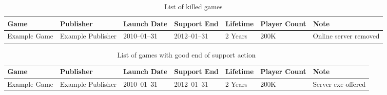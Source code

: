 \begin{landscape}
\begin{table}[htbp]
    \centering
    \caption{List of killed games}%
    \label{tab:killedgames}
    \begin{tabular*}{1\textwidth}{lllllll}
        Game & Publisher & Launch Date & Support End & Lifetime & Player Count & Note \\ \toprule
        Example Game & Example Publisher & 2010--01--31 & 2012--01--31 & 2 Years & 200K & Online server removed \\
    \end{tabular*}
\end{table}
\end{landscape}

\begin{landscape}
    \begin{table}[htbp]
        \centering
        \caption{List of games with good end of support action}%
        \label{tab:savedgames}
        \begin{tabular*}{1\textwidth}{lllllll}
            Game & Publisher & Launch Date & Support End & Lifetime & Player Count & Note \\ \toprule
            Example Game & Example Publisher & 2010--01--31 & 2012--01--31 & 2 Years & 200K & Server exe offered \\
        \end{tabular*}
    \end{table}
\end{landscape}
